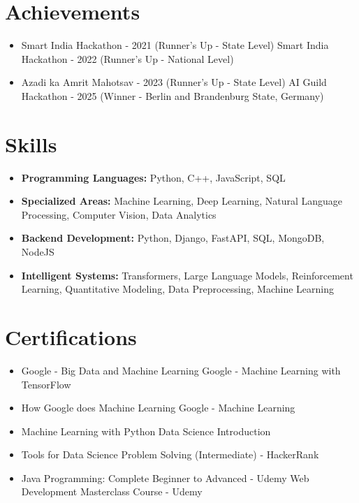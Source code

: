 \documentclass[a4paper,10pt]{article}
\begin{document}
\section*{Achievements}
\begin{itemize}
\item Smart India Hackathon - 2021 (Runner's Up - State Level) \hfill Smart India Hackathon - 2022 (Runner's Up - National Level)
\item Azadi ka Amrit Mahotsav - 2023 (Runner's Up - State Level) \hfill AI Guild Hackathon - 2025 (Winner - Berlin and Brandenburg State, Germany)
\end{itemize}

\section*{Skills}
\begin{itemize}
  \item \textbf{Programming Languages:} Python, C++, JavaScript, SQL
  \item \textbf{Specialized Areas:} Machine Learning, Deep Learning, Natural Language Processing, Computer Vision, Data Analytics
  \item \textbf{Backend Development:} Python, Django, FastAPI, SQL, MongoDB, NodeJS
  \item \textbf{Intelligent Systems:} Transformers, Large Language Models, Reinforcement Learning, Quantitative Modeling, Data Preprocessing, Machine Learning
\end{itemize}

\section*{Certifications}
\begin{itemize}
\item Google - Big Data and Machine Learning \hfill Google - Machine Learning with TensorFlow
\item How Google does Machine Learning \hfill Google - Machine Learning
\item Machine Learning with Python \hfill Data Science Introduction
\item Tools for Data Science \hfill Problem Solving (Intermediate) - HackerRank
\item Java Programming: Complete Beginner to Advanced - Udemy \hfill Web Development Masterclass Course - Udemy
\end{itemize}
\end{document}
